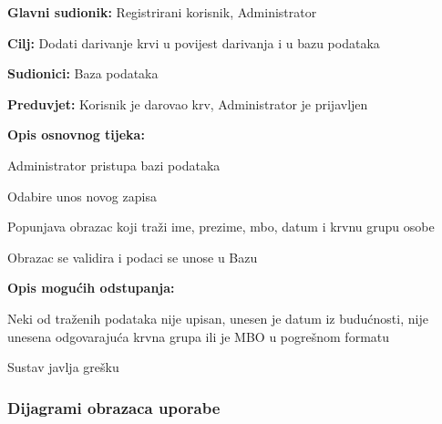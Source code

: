 					
					\noindent {}
					\begin{packed_item}
						
						\item \textbf{Glavni sudionik: }Registrirani korisnik, Administrator
						\item  \textbf{Cilj:} Dodati darivanje krvi u povijest darivanja i u bazu podataka
						\item  \textbf{Sudionici:} Baza podataka
						\item  \textbf{Preduvjet:} Korisnik je darovao krv, Administrator je prijavljen
						\item  \textbf{Opis osnovnog tijeka:}
						
						\item[] \begin{packed_enum}
							
							\item Administrator pristupa bazi podataka
							\item Odabire unos novog zapisa
							\item Popunjava obrazac koji traži ime, prezime, mbo, datum i krvnu grupu osobe
							\item Obrazac se validira i podaci se unose u Bazu
						\end{packed_enum}
						
						\item  \textbf{Opis mogućih odstupanja:}
						
						\item[] \begin{packed_item}
							
							\item[4.a] Neki od traženih podataka nije upisan, unesen je datum iz budućnosti, nije unesena odgovarajuća krvna grupa ili je MBO u pogrešnom formatu
							\item[] \begin{packed_enum}
								
								\item Sustav javlja grešku
								
						\end{packed_enum}				
							
						\end{packed_item}
					\end{packed_item}
					
					
					
				\subsubsection{Dijagrami obrazaca uporabe}
					
